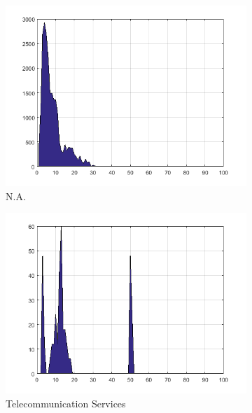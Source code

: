 \documentclass[11pt,a4,twosided,singlespacing,titlepagenumber=on]{scrreprt}
\numberwithin{equation}{chapter} %
\theoremstyle{remark}
\begin{document}
\begin{figure}[H]
\begin{subfigure}[t]{0.23\textwidth}
        \includegraphics[width=1\textwidth]{quad/9}
        \caption{N.A.}
    \end{subfigure}
    \begin{subfigure}[t]{0.23\textwidth}
        \centering
        \includegraphics[width=1\textwidth]{quad/10}
        \caption{Telecommunication Services}
    \end{subfigure}
    \begin{subfigure}[t]{0.23\textwidth}
        \centering

\end{subfigure}
\end{figure}
\end{document}

